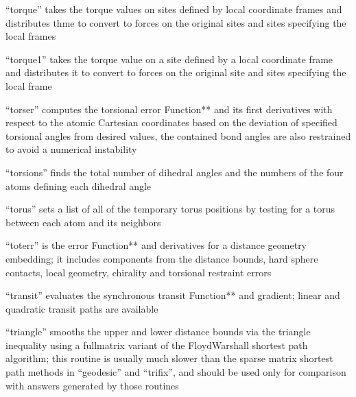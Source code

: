 \documentclass[letterpaper,11pt,english]{sphinxmanual}
\begin{document}

“torque” takes the torque values on sites defined by local coordinate frames and distributes thme to convert to forces on the original sites and sites specifying the local frames


“torque1” takes the torque value on a site defined by a local coordinate frame and distributes it to convert to forces on the original site and sites specifying the local frame


“torser” computes the torsional error Function** and its first derivatives with respect to the atomic Cartesian coordinates based on the deviation of specified torsional angles from desired values, the contained bond angles are also restrained to avoid a numerical instability


“torsions” finds the total number of dihedral angles and the numbers of the four atoms defining each dihedral angle


“torus” sets a list of all of the temporary torus positions by testing for a torus between each atom and its neighbors


“toterr” is the error Function** and derivatives for a distance geometry embedding; it includes components from the distance bounds, hard sphere contacts, local geometry, chirality and torsional restraint errors


“transit” evaluates the synchronous transit Function** and gradient; linear and quadratic transit paths are available


“triangle” smooths the upper and lower distance bounds via the triangle inequality using a full\sphinxhyphen{}matrix variant of the Floyd\sphinxhyphen{}Warshall shortest path algorithm; this routine is usually much slower than the sparse matrix shortest path methods in “geodesic” and “trifix”, and should be used only for comparison with answers generated by those routines

\end{document}
